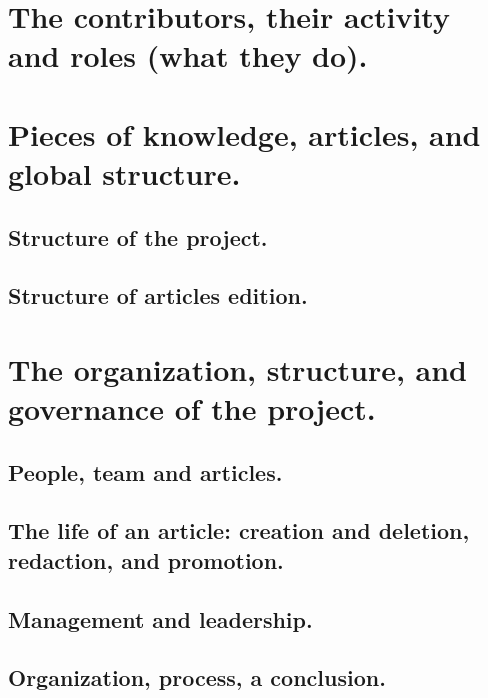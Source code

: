 \documentclass{report}
\begin{document}
\section{The contributors, their activity and roles (what they do).}\label{sec:The-contributors,-activity}


\section{Pieces of knowledge, articles, and global structure.}\label{sec:The-pieces-of-knowledge}


\subsection{Structure of the project.}

\subsection{Structure of articles edition.}


\section{The organization, structure, and governance of the project.}


\subsection{People, team and articles.}

\subsection{The life of an article: creation and deletion, redaction, and promotion.}


\subsection{Management and leadership.}


\subsection{Organization, process, a conclusion.}

\end{document}
